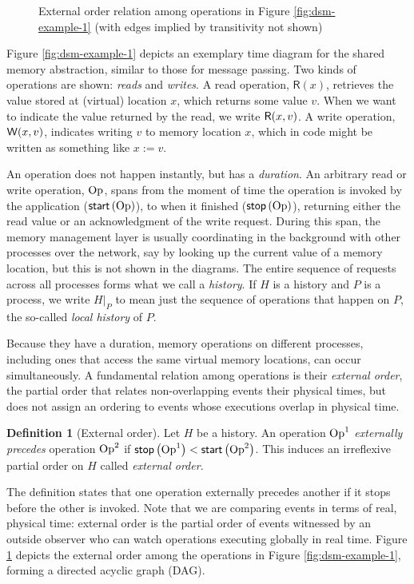 \documentclass[]             %
{NASA}                       %
\theoremstyle{definition}
\newtheorem{definition}[theorem]{Definition}
\begin{document}
\begin{figure}
  \centering
  
  \caption{External order relation among operations in Figure \ref{fig:dsm-example-1} (with edges implied by transitivity not shown)}
  \label{fig:dsm-example-1-DAG}
\end{figure}

Figure \ref{fig:dsm-example-1} depicts an exemplary time diagram for
the shared memory abstraction, similar to those for message
passing. Two kinds of operations are shown: \emph{reads} and
\emph{writes}. A read operation, $\mathsf{R}(x)$, retrieves the value
stored at (virtual) location $x$, which returns some value $v$. When
we want to indicate the value returned by the read, we write
$\mathsf{R}\!\left(x, v\right)$. A write operation, $\mathsf{W}\!\left(x, v\right)$, indicates
writing $v$ to memory location $x$, which in code might be written as
something like $x := v$.

An operation does not happen instantly, but has a \emph{duration}. An
arbitrary read or write operation, $\mathrm{Op}$, spans from the moment of
time the operation is invoked by the application ($\mathsf{start}\left(\mathrm{Op}\right)$),
to when it finished ($\mathsf{stop}\left(\mathrm{Op}\right)$), returning either the read value
or an acknowledgment of the write request. During this span, the
memory management layer is usually coordinating in the background with
other processes over the network, say by looking up the current value
of a memory location, but this is not shown in the diagrams. The
entire sequence of requests across all processes forms what we call a
\emph{history}. If $H$ is a history and $P$ is a process, we write
$H|_P$ to mean just the sequence of operations that happen on $P$, the
so-called \emph{local history} of $P$.

Because they have a duration, memory operations on different
processes, including ones that access the same virtual memory
locations, can occur simultaneously. A fundamental relation among
operations is their \emph{external order}, the partial order that
relates non-overlapping events their physical times, but does not
assign an ordering to events whose executions overlap in physical
time.
\begin{definition}[External order]
  \label{def:external-order}
  Let $H$ be a history. An operation $\mathrm{Op}^1$ \emph{externally
    precedes} operation $\mathrm{Op}^2$ if
  $\mathsf{stop}\left(\mathrm{Op}^1\right) < \mathsf{start}\left(\mathrm{Op}^2\right)$. This induces an irreflexive
  partial order on $H$ called \emph{external order}.
\end{definition}
The definition states that one operation externally precedes another
if it stops before the other is invoked. Note that we are comparing
events in terms of real, physical time: external order is the partial
order of events witnessed by an outside observer who can watch
operations executing globally in real time. Figure
\ref{fig:dsm-example-1-DAG} depicts the external order among the
operations in Figure \ref{fig:dsm-example-1}, forming a directed
acyclic graph (DAG).
\end{document}
